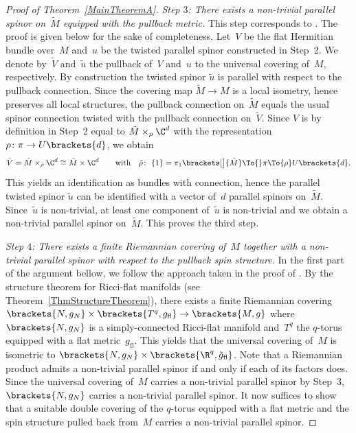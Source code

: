 \documentclass[pdftex]{sigma}
\numberwithin{equation}{section}
\begin{document}
\begin{proof}[Proof of Theorem~\ref{MainTheoremA}]
{\it Step $3$: There exists a non-trivial parallel spinor on~$\tilde{M}$ equipped with the pullback metric.} %
This step corresponds to \cite[Proposition~3.3]{Schick2021a}. The proof is given below for the sake of completeness. Let~$V$ be the flat Hermitian bundle over~$M$ and~$u$ be the twisted parallel spinor constructed in Step~2. We denote by~$\tilde{V}$ and~$\tilde{u}$ the pullback of~$V$ and~$u$ to the universal covering of~$M$, respectively. By construction the twisted spinor $\tilde{u}$ is parallel with respect to the pullback connection. Since the covering map $\tilde{M}\to M$ is a local isometry, hence preserves all local structures, the pullback connection on~$\tilde{M}$ equals the usual spinor connection twisted with the pullback connection on~$\tilde{V}$. Since $V$ is by definition in Step~2 equal to $\tilde{M}\times_{\rho} \C^d$ with the representation $\rho\colon \pi \to U\brackets{d}$, we obtain
\[
 \tilde{V}=\tilde{M}\times_{\tilde{\rho}}\C^d\cong\tilde{M}\times \C^d \qquad \text{with} \quad \tilde{\rho}\colon\ \{1\}=\pi_1\brackets[\big]{\tilde{M}}\To{} \pi \To{\rho} U\brackets{d}.
\]
This yields an identification  as bundles with connection, hence the parallel twisted spinor $\tilde{u}$ can be identified with a vector of~$d$ parallel spinors on~$\tilde{M}$. Since~$\tilde{u}$ is non-trivial, at least one component of~$\tilde{u}$ is non-trivial and we obtain a non-trivial parallel spinor on~$\tilde{M}$. This proves the third step.


{\it Step $4$: There exists a finite Riemannian covering of~$M$ together with a non-trivial parallel spinor with respect to the pullback spin structure.} %
In the first part of the argument bellow, we follow the approach taken in the proof of \cite[Lemma 2.7]{Schick2021a}. By the structure theorem for Ricci-flat manifolds (see Theorem~\ref{ThmStructureTheorem}), there exists a finite Riemannian covering~$\brackets{N,g_N}\times \brackets{T^q,g_{\text{fl}}} \to \brackets{M,g}$ where~$\brackets{N,g_N}$ is a simply-connected Ricci-flat manifold and~$T^q$ the $q$-torus equipped with a flat metric~$g_{\text{fl}}$. This yields that the universal covering of~$M$ is isometric to $\brackets{N,g_N}\times \brackets{\R^q,\tilde{g}_{\text{fl}}}$. Note that a Riemannian product admits a non-trivial parallel spinor if and only if each of its factors does. Since the universal covering of~$M$ carries a non-trivial parallel spinor by Step~3, $\brackets{N,g_N}$ carries a non-trivial parallel spinor. It now suffices to show that a suitable double covering of the $q$-torus equipped with a flat metric and the spin structure pulled back from~$M$ carries a non-trivial parallel spinor.


\end{proof}
\end{document}
